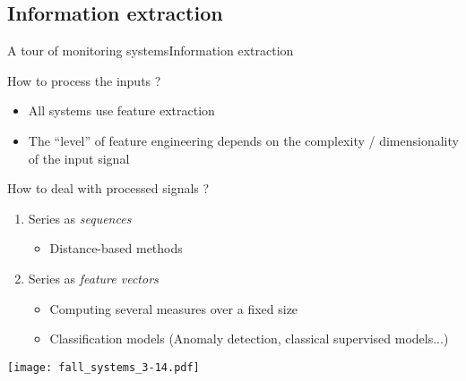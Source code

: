 \subsection{Information extraction}
\begin{frame}{A tour of monitoring systems}{Information extraction}

    \begin{minipage}[t]{0.49\linewidth}
    \vspace{0pt}
    How to process the inputs ?
    \begin{itemize}
        \item All systems use feature extraction
        \item The ``level'' of feature engineering depends on the complexity / dimensionality of the input signal
    \end{itemize}
    How to deal with processed signals ?
    \begin{tcolorbox}[title=Time series classification]
        \begin{enumerate}
            \item Series as \emph{sequences}
            \begin{itemize}
                \item Distance-based methods
            \end{itemize}
            \item Series as \emph{feature vectors}
            \begin{itemize}
                \item Computing several measures over a fixed size
                \item Classification models
                (Anomaly detection, classical supervised models...)
            \end{itemize}
        \end{enumerate}
    \end{tcolorbox}
    \end{minipage}
    \hfill
    \begin{minipage}[t]{0.49\linewidth}
    \vspace{0pt}
        \begin{overprint}
            \texttt{[image: fall\_systems\_3-14.pdf]}
        \end{overprint}
    \end{minipage}
\end{frame}

